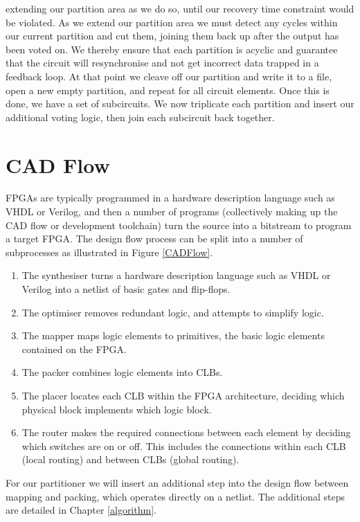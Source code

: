 \documentclass[12pt,final,oneside,a4paper]{dwThesis} %
\begin{document}
   extending our partition area as we do so, until our recovery time
   constraint would be violated.  As we extend our partition area we must
   detect any cycles within our current partition and cut them, joining them back up after the output has
   been voted on. We thereby ensure that each partition is acyclic and
   guarantee that the circuit will resynchronise and not get incorrect data
   trapped in a feedback loop.  At that point we cleave off our partition and
   write it to a file, open a new empty partition, and repeat for all circuit
   elements.  Once this is done, we have a set of subcircuits. We now
   triplicate each partition and insert our additional voting logic, then join
   each subcircuit back together.

   \section{\gls{CAD}
      Flow} \glspl{FPGA} are typically programmed
   in a hardware description language such as \gls{VHDL} or Verilog, and then a
   number of programs (collectively making up the \gls{CAD} flow or development
   toolchain) turn the source into a bitstream to program a target \gls{FPGA}.
   The design flow process can be split into a number of
   subprocesses as illustrated in Figure
   \ref{CADFlow}\cite{VPRBook,VPRManual,FPGAArch}.  
   \begin{enumerate}

      \item The synthesiser turns a hardware description language such as VHDL
         or Verilog into a netlist of basic gates and flip-flops.
      \item The optimiser removes redundant logic, and attempts to simplify
         logic.
      \item The mapper maps logic elements to \glspl{primitive}, the basic
         logic elements contained on the \gls{FPGA}.
      \item The packer combines logic elements into \glspl{CLB}.
      \item The placer locates each \gls{CLB} within the \gls{FPGA}
         architecture, deciding which physical block implements which logic
         block.
      \item The router makes the required connections between each element by
         deciding which switches are on or off. This includes the
         connections within each \gls{CLB} (local routing) and between
         \glspl{CLB} (global routing).  
   \end{enumerate}
   For our partitioner
   we will insert an additional step into the design flow between mapping
   and packing, which operates directly on a netlist. The additional steps
   are detailed in Chapter \ref{algorithm}.
\end{document}
